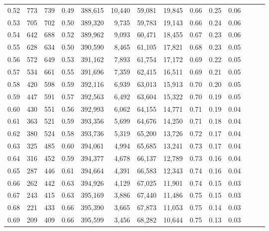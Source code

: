 \begin{tabular}{rrrrrrrrrrrrrr}
0.52 &     773 &    739 &  0.49 &  388,615 &   10,440 &  59,081 &  19,845 &  0.66 &  0.25 &      0.06 \\
0.53 &     705 &    702 &  0.50 &  389,320 &    9,735 &  59,783 &  19,143 &  0.66 &  0.24 &      0.06 \\
0.54 &     642 &    688 &  0.52 &  389,962 &    9,093 &  60,471 &  18,455 &  0.67 &  0.23 &      0.06 \\
0.55 &     628 &    634 &  0.50 &  390,590 &    8,465 &  61,105 &  17,821 &  0.68 &  0.23 &      0.05 \\
0.56 &     572 &    649 &  0.53 &  391,162 &    7,893 &  61,754 &  17,172 &  0.69 &  0.22 &      0.05 \\
0.57 &     534 &    661 &  0.55 &  391,696 &    7,359 &  62,415 &  16,511 &  0.69 &  0.21 &      0.05 \\
0.58 &     420 &    598 &  0.59 &  392,116 &    6,939 &  63,013 &  15,913 &  0.70 &  0.20 &      0.05 \\
0.59 &     447 &    591 &  0.57 &  392,563 &    6,492 &  63,604 &  15,322 &  0.70 &  0.19 &      0.05 \\
0.60 &     430 &    551 &  0.56 &  392,993 &    6,062 &  64,155 &  14,771 &  0.71 &  0.19 &      0.04 \\
0.61 &     363 &    521 &  0.59 &  393,356 &    5,699 &  64,676 &  14,250 &  0.71 &  0.18 &      0.04 \\
0.62 &     380 &    524 &  0.58 &  393,736 &    5,319 &  65,200 &  13,726 &  0.72 &  0.17 &      0.04 \\
0.63 &     325 &    485 &  0.60 &  394,061 &    4,994 &  65,685 &  13,241 &  0.73 &  0.17 &      0.04 \\
0.64 &     316 &    452 &  0.59 &  394,377 &    4,678 &  66,137 &  12,789 &  0.73 &  0.16 &      0.04 \\
0.65 &     287 &    446 &  0.61 &  394,664 &    4,391 &  66,583 &  12,343 &  0.74 &  0.16 &      0.04 \\
0.66 &     262 &    442 &  0.63 &  394,926 &    4,129 &  67,025 &  11,901 &  0.74 &  0.15 &      0.03 \\
0.67 &     243 &    415 &  0.63 &  395,169 &    3,886 &  67,440 &  11,486 &  0.75 &  0.15 &      0.03 \\
0.68 &     221 &    433 &  0.66 &  395,390 &    3,665 &  67,873 &  11,053 &  0.75 &  0.14 &      0.03 \\
0.69 &     209 &    409 &  0.66 &  395,599 &    3,456 &  68,282 &  10,644 &  0.75 &  0.13 &      0.03 \\

\end{tabular}
